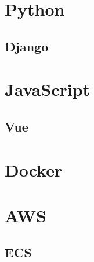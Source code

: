 
\section{Python}
\label{sec:Python}

\subsection{Django}


\section{JavaScript}
\label{sec:JS}

\subsection{Vue}


\section{Docker}
\label{sec:Docker}



\section{AWS}
\label{sec:AWS}

\subsection{ECS}